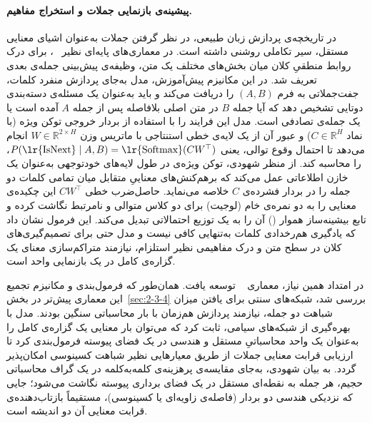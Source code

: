 \paragraph{پیشینه‌ی بازنمایی جملات و استخراج مفاهیم.}

در تاریخچه‌ی پردازش زبان طبیعی، در نظر گرفتن جملات به‌عنوان اشیای معنایی مستقل، سیر تکاملی روشنی داشته است. در معماری‌های پایه‌ای نظیر ~\cite{devlin2019bert}، برای درک روابط منطقیِ کلان میان بخش‌های مختلف یک متن، وظیفه‌ی پیش‌بینی جمله‌ی بعدی تعریف شد. در این مکانیزم پیش‌آموزش، مدل به‌جای پردازش منفرد کلمات، جفت‌جملاتی به فرم $(A, B)$ را دریافت می‌کند و باید به‌عنوان یک مسئله‌ی دسته‌بندی دوتایی تشخیص دهد که آیا جمله $B$ در متن اصلی بلافاصله پس از جمله $A$ آمده است یا یک جمله‌ی تصادفی است. مدل این فرایند را با استفاده از بردار خروجی توکن ویژه \lr{[CLS]} (با نماد $C \in \mathbb{R}^H$) و عبور آن از یک لایه‌ی خطی استنتاجی با ماتریس وزن $W \in \mathbb{R}^{2 \times H}$ انجام می‌دهد تا احتمال وقوع توالی، یعنی $P(\text{\lr{IsNext}} \mid A, B) = \text{\lr{Softmax}}(CW^\top)$، را محاسبه کند. از منظر شهودی، توکن ویژه‌ی \lr{[CLS]} در طول لایه‌های خودتوجهی به‌عنوان یک خازن اطلاعاتی عمل می‌کند که برهم‌کنش‌های معناییِ متقابل میان تمامی کلمات دو جمله را در بردار فشرده‌ی $C$ خلاصه می‌نماید. حاصل‌ضرب خطی $CW^\top$ این چکیده‌ی معنایی را به دو نمره‌ی خام (لوجیت) برای دو کلاس متوالی و نامرتبط نگاشت کرده و تابع بیشینه‌ساز هموار () آن را به یک توزیع احتمالاتی تبدیل می‌کند. این فرمول نشان داد که یادگیری هم‌رخدادی کلمات به‌تنهایی کافی نیست و مدل حتی برای تصمیم‌گیری‌های کلان در سطح متن و درک مفاهیمی نظیر استلزام، نیازمند متراکم‌سازی معنای یک گزاره‌ی کامل در یک بازنمایی واحد است.

در امتداد همین نیاز، معماری ~\cite{reimers2019sentencebert} توسعه یافت. همان‌طور که فرمول‌بندی و مکانیزم تجمیع این معماری پیش‌تر در بخش~\ref{sec:2-3-4} بررسی شد، شبکه‌های سنتی برای یافتن میزان شباهت دو جمله، نیازمند پردازش هم‌زمان با بار محاسباتی سنگین بودند. مدل  با بهره‌گیری از شبکه‌های سیامی، ثابت کرد که می‌توان بار معنایی یک گزاره‌ی کامل را به‌عنوان یک واحد محاسباتیِ مستقل و هندسی در یک فضای پیوسته فرمول‌بندی کرد تا ارزیابی قرابت معنایی جملات از طریق معیارهایی نظیر شباهت کسینوسی امکان‌پذیر گردد. به بیان شهودی، به‌جای مقایسه‌ی پرهزینه‌ی کلمه‌به‌کلمه در یک گراف محاسباتی حجیم، هر جمله به نقطه‌ای مستقل در یک فضای برداری پیوسته نگاشت می‌شود؛ جایی که نزدیکی هندسی دو بردار (فاصله‌ی زاویه‌ای یا کسینوسی)، مستقیماً بازتاب‌دهنده‌ی قرابت معنایی آن دو اندیشه است.

